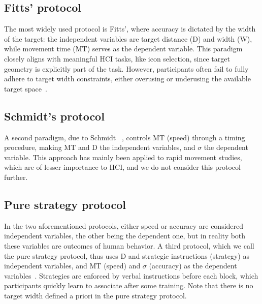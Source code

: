 \documentclass[acmlarge, manuscript,review]{acmart}
\begin{document}
\subsection{Fitts' protocol\label{background:protocols:fitts_protocol}}
The most widely used protocol is Fitts', where accuracy is dictated by the width of the target: the independent variables are target distance (D) and width (W), while movement time (MT) serves as the dependent variable. This paradigm closely aligns with meaningful HCI tasks, like icon selection, since target geometry is explicitly part of the task. However, participants often fail to fully adhere to target width constraints, either overusing or underusing the available target space~\cite{guiard2011,zhai2004nominal}.




\subsection{Schmidt's protocol\label{background:protocols:schmidt_protocol}}
A second paradigm, due to Schmidt \etal~\cite{schmidt1979}, controls MT (speed) through a timing procedure, making MT and D the independent variables, and $\sigma$ the dependent variable. This approach has mainly been applied to rapid movement studies, which are of lesser importance to HCI, and we do not consider this protocol further. %

\subsection{Pure strategy protocol\label{background:protocols:guiard_protocol}}
In the two aforementioned protocols, either speed or accuracy are considered independent variables, the other being the dependent one, but in reality both these variables are outcomes of human behavior.
A third protocol, which we call the pure strategy protocol, thus uses D and strategic instructions (strategy) as independent variables, and MT (speed) and $\sigma$ (accuracy) as the dependent variables~\cite{guiard2011b}. Strategies are enforced by verbal instructions before each block, which participants quickly learn to associate after some training. Note that there is no target width defined a priori in the pure strategy protocol.
\end{document}

